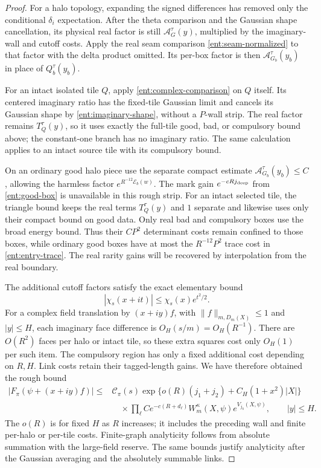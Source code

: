 \begin{proof}
For a halo topology, expanding the signed differences has removed
only the conditional \(\delta_i\) expectation.  After the theta
comparison and the Gaussian shape cancellation, its physical real
factor is still \(\mathcal A_G^\tau(y)\), multiplied by the
imaginary-wall and cutoff costs.  Apply the real seam comparison
\eqref{ent:seam-normalized} to that factor with the delta product
omitted.  Its per-box factor is then
\(\mathcal A_{G_b}^\tau(y_b)\) in place of \(Q_b^\tau(y_b)\).

For an intact isolated tile \(Q\), apply
\eqref{ent:complex-comparison} on \(Q\) itself.  Its centered imaginary
ratio has the fixed-tile Gaussian limit and cancels its Gaussian shape
by \eqref{ent:imaginary-shape}, without a \(P\)-wall strip.  The real
factor remains \(T_Q^\tau(y)\), so it uses exactly the full-tile good,
bad, or compulsory bound above; the constant-one branch has no imaginary ratio.
The same calculation applies to an intact source tile with its
compulsory bound.

On an ordinary good halo piece use the separate compact estimate
\(\mathcal A_{G_b}^\tau(y_b)\le C\), allowing the harmless factor
\(e^{R^{-12}\mathcal E_b(w)}\).  The mark gain \(e^{-cRj_{\rm deep}}\)
from \eqref{ent:good-box} is unavailable in this rough strip.
For an intact selected tile, the triangle bound keeps the real
terms \(T_Q^\tau(y)\) and \(1\) separate and likewise uses only
their compact bound on good data.  Only real bad and compulsory
boxes use the broad energy bound.  Thus their \(CP^2\) determinant
costs remain confined to those boxes, while ordinary good boxes
have at most the \(R^{-12}P^2\) trace cost in
\eqref{ent:entry-trace}.  The real rarity gains will be recovered
by interpolation from the real boundary.

The additional cutoff factors satisfy the exact elementary
bound
\[
            |\chi_s(x+it)|\le \chi_s(x)e^{t^2/2}.
\]
For a complex field translation by \((x+iy)f\), with
\(\|f\|_{m,D_m(X)}\le1\) and \(|y|\le H\), each imaginary
face difference is \(O_H(s/m)=O_H(R^{-1})\).
There are \(O(R^2)\) faces per halo or intact tile, so these extra
squares cost only \(O_H(1)\) per such item.  The compulsory
region has only a fixed additional cost depending on
\(R,H\).  Link costs retain their tagged-length gains.
We have therefore obtained the rough bound
\begin{equation}\label{ent:rough-strip}
\begin{split}
 |F_\pi(\psi+(x+iy)f)|
 \le {}& \mathcal C_\pi(s)
 \exp\{o(R)(j_1+j_2)+C_H(1+x^2)|X|\}\\
 &\quad{}\times
 \prod_\ell Ce^{-c(R+d_\ell)}
 W_m^\kappa(X,\psi)e^{V_{j_0}(X,\psi)},
                    \qquad |y|\le H.
\end{split}
\end{equation}
The \(o(R)\) is for fixed \(H\) as \(R\) increases; it
includes the preceding wall and finite per-halo or per-tile costs.
Finite-graph analyticity follows from absolute
summation with the large-field reserve.  The same bounds
justify analyticity after the Gaussian averaging and
the absolutely summable links.


\end{proof}
